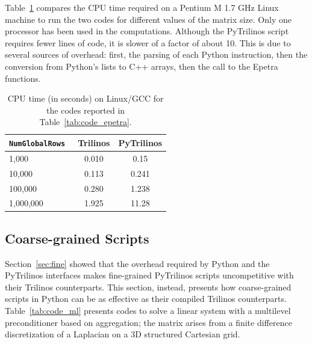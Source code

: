 \documentclass[acmtocl]{acmtrans2m}
\begin{document}
Table~\ref{tab:time_epetra} compares the CPU time required on a Pentium M 1.7
GHz Linux machine to run the two codes for different values of the
matrix size. Only one processor has been used in the computations.
Although the PyTrilinos script requires fewer lines of code, it is
slower of a factor of about 10. This is due to several sources of
overhead: first, the parsing of each Python instruction, then the
conversion from Python's lists to C++ arrays, then the call to the
Epetra functions.

\begin{table}
  \begin{center}
    \begin{tabular}{| l | c | c |}
      \hline
      \tt NumGlobalRows & Trilinos & PyTrilinos \\
      \hline
      1,000     & 0.010 & 0.15  \\
      10,000    & 0.113 & 0.241 \\
      100,000   & 0.280 & 1.238 \\
      1,000,000 & 1.925 & 11.28 \\
      \hline
    \end{tabular}
    \caption{CPU time (in seconds) on Linux/GCC for the codes reported
      in Table~\ref{tab:code_epetra}.}
    \label{tab:time_epetra}
  \end{center}
\end{table}

\subsection{Coarse-grained Scripts}
\label{sec:coarse}

Section~\ref{sec:fine} showed that the overhead required by Python and
the PyTrilinos interfaces makes fine-grained PyTrilinos scripts
uncompetitive with their Trilinos counterparts. This section, instead,
presents how coarse-grained scripts in Python can be as effective as
their compiled Trilinos counterparts.  Table~\ref{tab:code_ml}
presents codes to solve a linear system with a multilevel
preconditioner based on aggregation; the matrix arises from a finite
difference discretization of a Laplacian on a 3D structured Cartesian
grid.
\end{document}

